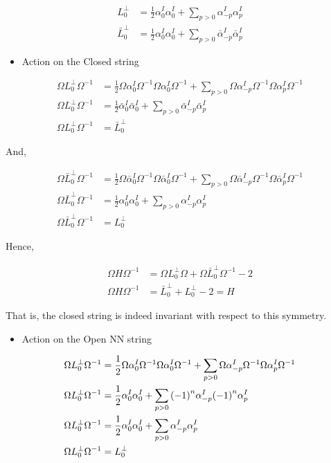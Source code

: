 \begin{align*}
    L^\perp_0&=\frac12\alpha_0^I\alpha_0^I+\sum\limits_{p>0}\alpha^I_{-p}\alpha^I_p\\
    {\bar L}^\perp_0&=\frac12\alpha_0^I\alpha_0^I+\sum\limits_{p>0}{\bar \alpha}^I_{-p}{\bar\alpha}^I_p
\end{align*}

\begin{itemize}
    \item Action on the Closed string
\end{itemize}
\begin{align*}
    \Omega L^\perp_0\Omega^{-1}&=\frac12\Omega\alpha_0^I\Omega^{-1}\Omega\alpha_0^I\Omega^{-1}+\sum\limits_{p>0}\Omega\alpha^I_{-p}\Omega^{-1}\Omega\alpha^I_p\Omega^{-1}\\
    \Omega L^\perp_0\Omega^{-1}&=\frac12{\bar\alpha}_0^I{\bar\alpha}_0^I+\sum\limits_{p>0}{\bar\alpha}^I_{-p}{\bar\alpha}^I_p\\
    \Omega L^\perp_0\Omega^{-1}&={\bar L}_0^\perp
\end{align*}

And,

\begin{align*}
    \Omega {\bar L}^\perp_0\Omega^{-1}&=\frac12\Omega{\bar \alpha}_0^I\Omega^{-1}\Omega{\bar \alpha}_0^I\Omega^{-1}+\sum\limits_{p>0}\Omega{\bar \alpha}^I_{-p}\Omega^{-1}\Omega{\bar \alpha}^I_p\Omega^{-1}\\
    \Omega {\bar L}^\perp_0\Omega^{-1}&=\frac12{\alpha}_0^I{\alpha}_0^I+\sum\limits_{p>0}{\alpha}^I_{-p}{\alpha}^I_p\\
    \Omega {\bar L}^\perp_0\Omega^{-1}&={ L}_0^\perp
\end{align*}

Hence,

\begin{align*}
    \Omega H\Omega^{-1}&=\Omega L^\perp_0\Omega+\Omega{\bar L}^\perp_0\Omega^{-1}-2\\
    \Omega H\Omega^{-1}&={\bar L}^\perp_0+ L^\perp_0-2=H
\end{align*}

That is, the closed string is indeed invariant with respect to this symmetry.

\begin{itemize}
    \item Action on the Open NN string
\end{itemize}
\begin{align*}
    \Omega L^\perp_0\Omega^{-1}&=\frac12\Omega\alpha_0^I\Omega^{-1}\Omega\alpha_0^I\Omega^{-1}+\sum\limits_{p>0}\Omega\alpha^I_{-p}\Omega^{-1}\Omega\alpha^I_p\Omega^{-1}\\
    \Omega L^\perp_0\Omega^{-1}&=\frac12{\alpha}_0^I{\alpha}_0^I+\sum\limits_{p>0}\qty(-1)^n{\alpha}^I_{-p}\qty(-1)^n{\alpha}^I_p\\
    \Omega L^\perp_0\Omega^{-1}&=\frac12{\alpha}_0^I{\alpha}_0^I+\sum\limits_{p>0}{\alpha}^I_{-p}{\alpha}^I_p\\
    \Omega L^\perp_0\Omega^{-1}&={L}_0^\perp
\end{align*}

